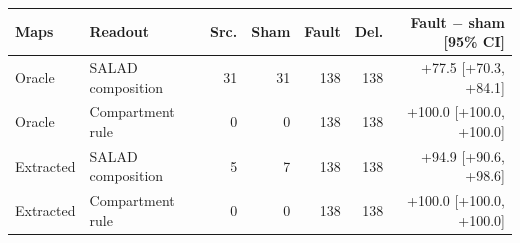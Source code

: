\begin{tabular}{@{}llrrrrr@{}}
\toprule
Maps & Readout & Src. & Sham & Fault & Del. & Fault $-$ sham [95\% CI] \\
\midrule
Oracle & SALAD composition & 31 & 31 & 138 & 138 & +77.5 [+70.3, +84.1] \\
Oracle & Compartment rule & 0 & 0 & 138 & 138 & +100.0 [+100.0, +100.0] \\
\midrule
Extracted & SALAD composition & 5 & 7 & 138 & 138 & +94.9 [+90.6, +98.6] \\
Extracted & Compartment rule & 0 & 0 & 138 & 138 & +100.0 [+100.0, +100.0] \\
\bottomrule
\end{tabular}
